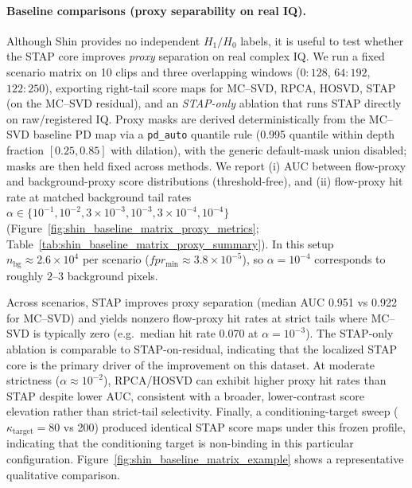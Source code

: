 \paragraph{Baseline comparisons (proxy separability on real IQ).}
Although Shin provides no independent $H_1/H_0$ labels, it is useful to test whether the STAP core improves \emph{proxy} separation on real complex IQ.
We run a fixed scenario matrix on 10 clips and three overlapping windows ($0{:}128$, $64{:}192$, $122{:}250$), exporting right-tail score maps for MC--SVD, RPCA, HOSVD, STAP (on the MC--SVD residual), and an \emph{STAP-only} ablation that runs STAP directly on raw/registered IQ.
Proxy masks are derived deterministically from the MC--SVD baseline PD map via a \texttt{pd\_auto} quantile rule (0.995 quantile within depth fraction $[0.25,0.85]$ with dilation), with the generic default-mask union disabled; masks are then held fixed across methods.
We report (i) AUC between flow-proxy and background-proxy score distributions (threshold-free), and (ii) flow-proxy hit rate at matched background tail rates $\alpha\in\{10^{-1},10^{-2},3\times 10^{-3},10^{-3},3\times 10^{-4},10^{-4}\}$ (Figure~\ref{fig:shin_baseline_matrix_proxy_metrics}; Table~\ref{tab:shin_baseline_matrix_proxy_summary}).
In this setup $n_{\mathrm{bg}}\approx 2.6\times 10^4$ per scenario ($fpr_{\min}\approx 3.8\times 10^{-5}$), so $\alpha=10^{-4}$ corresponds to roughly $2$--$3$ background pixels.

Across scenarios, STAP improves proxy separation (median AUC 0.951 vs 0.922 for MC--SVD) and yields nonzero flow-proxy hit rates at strict tails where MC--SVD is typically zero (e.g.\ median hit rate 0.070 at $\alpha=10^{-3}$).
The STAP-only ablation is comparable to STAP-on-residual, indicating that the localized STAP core is the primary driver of the improvement on this dataset.
At moderate strictness ($\alpha\approx 10^{-2}$), RPCA/HOSVD can exhibit higher proxy hit rates than STAP despite lower AUC, consistent with a broader, lower-contrast score elevation rather than strict-tail selectivity.
Finally, a conditioning-target sweep ($\kappa_{\mathrm{target}}=80$ vs 200) produced identical STAP score maps under this frozen profile, indicating that the conditioning target is non-binding in this particular configuration.
Figure~\ref{fig:shin_baseline_matrix_example} shows a representative qualitative comparison.

